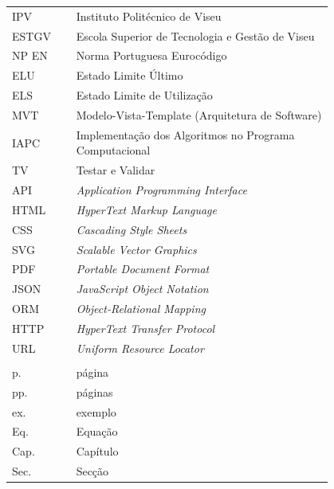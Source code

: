 \begin{flushleft}
\begin{tabular}{l p{0.8\linewidth}}
IPV & Instituto Politécnico de Viseu \\
ESTGV & Escola Superior de Tecnologia e Gestão de Viseu \\
NP EN & Norma Portuguesa Eurocódigo \\
ELU & Estado Limite Último \\
ELS & Estado Limite de Utilização \\

MVT & Modelo-Vista-Template (Arquitetura de Software) \\
IAPC & Implementação dos Algoritmos no Programa Computacional \\
TV & Testar e Validar \\
API & \textit{Application Programming Interface} \\
HTML & \textit{HyperText Markup Language} \\
CSS & \textit{Cascading Style Sheets} \\
SVG & \textit{Scalable Vector Graphics} \\
PDF & \textit{Portable Document Format} \\
JSON & \textit{JavaScript Object Notation} \\
ORM & \textit{Object-Relational Mapping} \\
HTTP & \textit{HyperText Transfer Protocol} \\
URL & \textit{Uniform Resource Locator} \\

\\
p. & página \\
pp. & páginas \\
ex. & exemplo \\
Eq. & Equação \\
Cap. & Capítulo \\
Sec. & Secção \\
\end{tabular}
\end{flushleft}